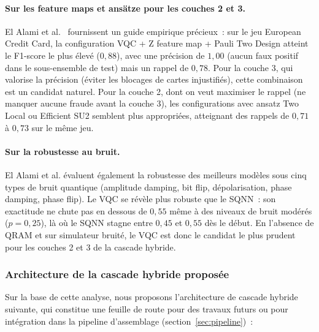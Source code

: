 \documentclass[a4paper]{article}
\begin{document}
\paragraph{Sur les feature maps et ansätze pour les couches 2 et 3.} El Alami et al.~\cite{elalami2026} fournissent un guide empirique précieux~: sur le jeu European Credit Card, la configuration VQC + Z feature map + Pauli Two Design atteint le F1-score le plus élevé ($0{,}88$), avec une précision de $1{,}00$ (aucun faux positif dans le sous-ensemble de test) mais un rappel de $0{,}78$. Pour la couche 3, qui valorise la précision (éviter les blocages de cartes injustifiés), cette combinaison est un candidat naturel. Pour la couche 2, dont on veut maximiser le rappel (ne manquer aucune fraude avant la couche 3), les configurations avec ansatz Two Local ou Efficient SU2 semblent plus appropriées, atteignant des rappels de $0{,}71$ à $0{,}73$ sur le même jeu.
 
\paragraph{Sur la robustesse au bruit.} El Alami et al. évaluent également la robustesse des meilleurs modèles sous cinq types de bruit quantique (amplitude damping, bit flip, dépolarisation, phase damping, phase flip). Le VQC se révèle plus robuste que le SQNN~: son exactitude ne chute pas en dessous de $0{,}55$ même à des niveaux de bruit modérés ($p = 0{,}25$), là où le SQNN stagne entre $0{,}45$ et $0{,}55$ dès le début. En l'absence de QRAM et sur simulateur bruité, le VQC est donc le candidat le plus prudent pour les couches 2 et 3 de la cascade hybride.
 
\subsubsection{Architecture de la cascade hybride proposée}
 
Sur la base de cette analyse, nous proposons l'architecture de cascade hybride suivante, qui constitue une feuille de route pour des travaux futurs ou pour intégration dans la pipeline d'assemblage (section~\ref{sec:pipeline})~:
 
\end{document}

